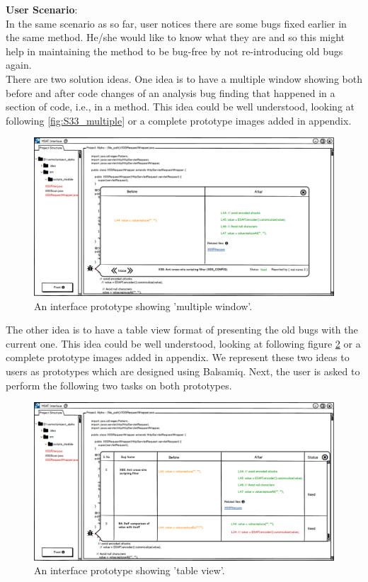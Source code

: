 \textbf{User Scenario}: \\

In the same scenario as so far, user notices there are some bugs fixed earlier in the same method. He/she would like to know what they are and so this might help in maintaining the method to be bug-free by not re-introducing old bugs again. \\

There are two solution ideas. One idea is to have a multiple window showing both before and after code changes of an analysis bug finding that happened in a section of code, i.e., in a method. This idea could be well understood, looking at following \autoref{fig:S33_multiple} or a complete prototype images added in appendix. \\


\begin{figure}[hbt!]
	\centering
	\includegraphics[width=\linewidth]{figures/solution_ideas_snaps/S33_multiple}
	\caption{An interface prototype showing 'multiple window'.}
	\label{fig:S33_multiple}
\end{figure}

The other idea is to have a table view format of presenting the old bugs with the current one. This idea could be well understood, looking at following figure \ref{fig:S33_table} or a complete prototype images added in appendix. We represent these two ideas to users as prototypes which are designed using Balsamiq. Next, the user is asked to perform the following two tasks on both prototypes. \\

\begin{figure}[hbt!]
	\centering
	\includegraphics[width=\linewidth]{figures/solution_ideas_snaps/S33_table}
	\caption{An interface prototype showing 'table view'.}
	\label{fig:S33_table}
\end{figure}

